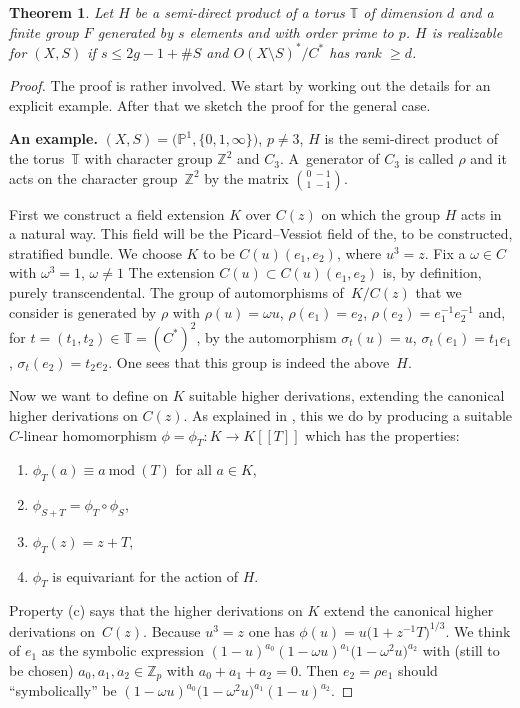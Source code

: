 \documentclass[10pt,a4paper]{amsart}
\numberwithin{equation}{section}
\newtheorem{Theorem}{Theorem}[section]
\begin{document}
 \begin{Theorem}\label{2.1} Let $H$ be a semi-direct product of a torus $\mathbb{T}$ of dimension $d$ and a finite group
 $F$ generated by $s$ elements and with order prime to $p$.
 $H$ is realizable for $(X,S)$ if $s\leq 2g-1+\# S$ and
 $O(X\setminus S)^*/C^*$ has rank $\geq d$.
 \end{Theorem}
 \begin{proof} The proof is rather involved. We start by working out the details for an explicit example. After that we sketch the proof for the general case.

{\bf An example.} $(X,S)=\big(\mathbb{P}^1,\{0,1,\infty \}\big)$, $p\neq 3$, $H$ is the semi-direct product of the torus~$\mathbb{T}$ with character group $\mathbb{Z}^2$ and $C_3$. A~generator of $C_3$ is called $\rho$ and it acts on the character group~$\mathbb{Z}^2$ by the matrix ${0\ -1\choose 1\ -1 }$.

First we construct a field extension $K$ over $C(z)$ on which the group $H$ acts in a natural way. This field will be the Picard--Vessiot field of the, to be constructed, stratified bundle. We choose $K$ to be $C(u)(e_1,e_2)$, where $u^3=z$. Fix a $\omega \in C$ with $\omega ^3=1$, $\omega \neq 1$ The extension $C(u)\subset C(u)(e_1,e_2)$ is, by definition, purely transcendental. The group of automorphisms of~$K/C(z)$ that we consider is generated by $\rho$ with $\rho (u)=\omega u$, $\rho (e_1)=e_2$, $\rho(e_2)=e_1^{-1}e_2^{-1}$ and, for $t=(t_1,t_2)\in \mathbb{T}=(C^*)^2$, by the automorphism $\sigma_t(u)=u$, $\sigma_t(e_1)=t_1e_1$, $ \sigma_t(e_2)=t_2e_2$. One sees that this group is indeed the above~$H$.

Now we want to define on $K$ suitable higher derivations, extending the canonical higher derivations on $C(z)$. As explained in \cite[Section~2.1]{Ma-vdP1}, this we do by producing a suitable $C$-linear homomorphism $\phi=\phi _T\colon K\rightarrow K[[T]]$ which has the properties:
\begin{enumerate}\itemsep=0pt
\item[(a)] $\phi_T (a)\equiv a \ \text{mod}\ (T)$ for all $a\in K$,
\item[(b)] $\phi _{S+T}=\phi_T \circ \phi_S$,
\item[(c)] $\phi_T(z)=z+T$,
\item[(d)] $\phi_T$ is equivariant for the action of $H$.
\end{enumerate}
Property (c) says that the higher derivations on $K$ extend the canonical higher derivations on~$C(z)$. Because $u^3=z$ one has $\phi(u)=u\big(1+z^{-1}T\big)^{1/3}$. We think of $e_1$ as the symbolic expres\-sion $(1-u)^{a_0}(1-\omega u)^{a_1}\big(1-\omega ^2u\big)^{a_2}$ with (still to be chosen) $a_0,a_1,a_2\in \mathbb{Z}_p$ with $a_0+a_1+a_2=0$. Then $e_2=\rho e_1$ should ``symbolically'' be $(1-\omega u)^{a_0}\big(1-\omega^2 u\big)^{a_1}(1-u)^{a_2}$.


\end{proof}
\end{document}
